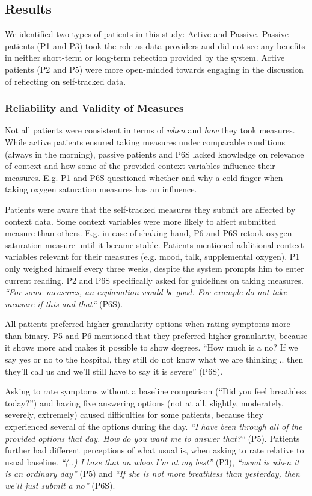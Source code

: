 \subsection{Results}    
We identified two types of patients in this study: Active and Passive. Passive patients (P1 and P3) took the role as data providers and did not see any benefits in neither short-term or long-term reflection provided by the system. Active patients (P2 and P5) were more open-minded towards engaging in the discussion of reflecting on self-tracked data. 

\subsubsection{Reliability and Validity of Measures}
Not all patients were consistent in terms of \textit{when} and \textit{how} they took measures. While active patients ensured taking measures under comparable conditions (always in the morning), passive patients and P6S lacked knowledge on relevance of context and how some of the provided context variables influence their measures. E.g. P1 and P6S questioned whether and why a cold finger when taking oxygen saturation measures has an influence. 

Patients were aware that the self-tracked measures they submit are affected by context data. Some context variables were more likely to affect submitted measure than others. E.g. in case of shaking hand, P6 and P6S retook oxygen saturation measure until it became stable. Patients mentioned additional context variables relevant for their measures (e.g. mood, talk, supplemental oxygen). P1 only weighed himself every three weeks, despite the system prompts him to enter current reading. P2 and P6S specifically asked for guidelines on taking measures. \textit{“For some measures, an explanation would be good. For example do not take measure if this and that“} (P6S).

All patients preferred higher granularity options when rating symptoms more than binary. P5 and P6 mentioned that they preferred higher granularity, because it shows more and makes it possible to show degrees. “How much is a no? If we say yes or no to the hospital, they still do not know what we are thinking .. then they’ll call us and we’ll still have to say it is severe” (P6S).

Asking to rate symptoms without a baseline comparison (“Did you feel breathless today?”) and having five answering options (not at all, slightly, moderately, severely, extremely) caused difficulties for some patients, because they experienced several of the options during the day. \textit{“I have been through all of the provided options that day. How do you want me to answer that?“} (P5). Patients further had different perceptions of what usual is, when asking to rate relative to usual baseline. \textit{“(..) I base that on when I’m at my best”} (P3), \textit{“usual is when it is an ordinary day”} (P5) and \textit{“If she is not more breathless than yesterday, then we’ll just submit a no”} (P6S).

